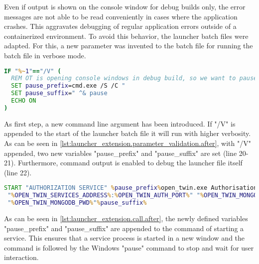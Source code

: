 Even if output is shown on the console window for debug builds only, the error messages are not able to be read conveniently in cases where the application crashes. This aggravates debugging of regular application errors outside of a containerized environment.
To avoid this behavior, the launcher batch files were adapted. For this, a new parameter was invented to the batch file for running the batch file in verbose mode.

\begin{lstlisting}[label=lst:launcher_extension.parameter_validation.after, caption={Additional command argument for preventing close of window after termination (/Microservices/Launcher/OpenTwin\_session.bat)}, language=cmd, firstnumber=18]
IF "%~1"=="/V" (
  REM OT is opening console windows in debug build, so we want to pause them at the end
  SET pause_prefix=cmd.exe /S /C "
  SET pause_suffix=" ^& pause
  ECHO ON
)
\end{lstlisting}
As first step, a new command line argument has been introduced. If "/V" is appended to the start of the launcher batch file it will run with higher verbosity.  As can be seen in \autoref{lst:launcher_extension.parameter_validation.after}, with "/V" appended, two new variables "pause\_prefix" and "pause\_suffix" are set (line 20-21). Furthermore, command output is enabled to debug the launcher file itself (line 22).

\begin{lstlisting}[label=lst:launcher_extension.call.after, caption={Additional command extension for preventing close of window after termination (/Microservices/Launcher/OpenTwin\_session.bat)}, language=cmd, firstnumber=34]
START "AUTHORIZATION SERVICE" %pause_prefix%open_twin.exe AuthorisationService.dll <*@ \Suppressnumber @*>
 "%OPEN_TWIN_SERVICES_ADDRESS%:%OPEN_TWIN_AUTH_PORT%" "%OPEN_TWIN_MONGODB_ADDRESS%"
 "%OPEN_TWIN_MONGODB_PWD%"%pause_suffix%
\end{lstlisting}
As can be seen in \autoref{lst:launcher_extension.call.after}, the newly defined variables "pause\_prefix" and "pause\_suffix" are appended to the command of starting a service. This ensures that a service process is started in a new window and the command is followed by the \ac{Windows} "pause" command to stop and wait for user interaction.


